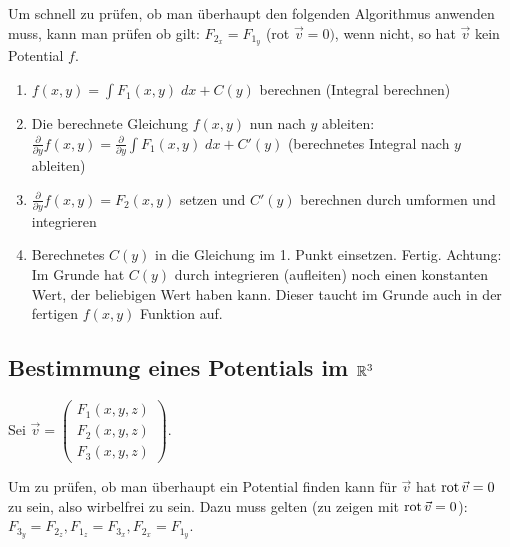 Um schnell zu prüfen, ob man überhaupt den folgenden Algorithmus anwenden muss,
kann man prüfen ob gilt: $F_{2_x} = F_{1_y}$ (rot $\vec{v} = 0)$, wenn nicht, so hat $\vec{v}$ kein Potential $f$.

\begin{enumerate}[itemsep=1em]
	\item $f(x,y) = \int F_1(x,y)\;dx + C(y)$ berechnen (Integral berechnen)
	\item Die berechnete Gleichung $f(x,y)$ nun nach $y$ ableiten:
	$\frac{\partial}{\partial y} f(x,y) = \frac{\partial}{\partial y}\int F_1(x,y)\;dx + C'(y)$
	(berechnetes Integral nach $y$ ableiten)
	\item $\frac{\partial}{\partial y} f(x,y) = F_2(x,y)$ setzen und $C'(y)$ berechnen durch umformen
	und integrieren
	\item Berechnetes $C(y)$ in die Gleichung im 1. Punkt einsetzen. Fertig. Achtung: Im Grunde hat
	$C(y)$ durch integrieren (aufleiten) noch einen konstanten Wert, der beliebigen Wert haben kann.
	Dieser taucht im Grunde auch in der fertigen $f(x,y)$ Funktion auf.
\end{enumerate}

\subsection{Bestimmung eines Potentials im $\mathbb{R}^3$}
Sei $\vec{v} = \begin{pmatrix}
F_1(x,y,z)\\
F_2(x,y,z)\\
F_3(x,y,z)
\end{pmatrix}$.

Um zu prüfen, ob man überhaupt ein Potential finden kann für $\vec{v}$ hat $\operatorname{rot} \vec{v} = 0$
zu sein, also wirbelfrei zu sein. Dazu muss gelten (zu zeigen mit $\operatorname{rot} \vec{v} = 0$): 
$F_{3_y} = F_{2_z}, F_{1_z} = F_{3_x}, F_{2_x} = F_{1_y}$.

